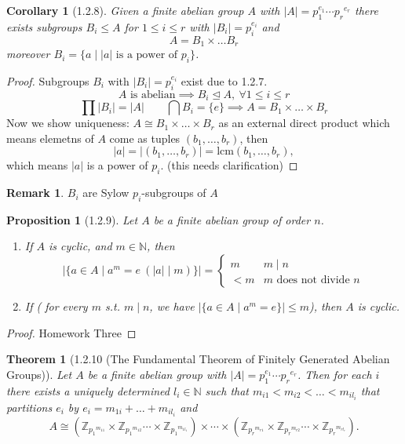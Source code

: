 \documentclass[11pt,leqno,oneside]{amsart}
\newcommand{\N}{{\mathbb N}} %
\newcommand{\Z}{{\mathbb Z}} %
\newcommand{\normsubgroup}{\mathrel{\unlhd}}
\newcommand{\isom}{\mathrel{\cong}}
\newcommand{\primedecomposition}[3]{#1_1^{#2_1} \cdots {#1_{#3}}^{#2_{#3}}}
\newtheorem*{thm*}{Theorem}
\newtheorem*{prop*}{Proposition}
\newtheorem*{cor*}{Corollary}
\theoremstyle{definition}
\newtheorem*{rmk*}{Remark}
\numberwithin{equation}{section}
\begin{document}
\begin{cor*}[1.2.8]
  Given a finite abelian group \(A\)
  with
  \(|A|=\primedecomposition{p}{e}{r}\)
  there exists subgroups \(B_i \le A\)
  for \(1 \le i \le r\) with
  \(|B_i|=p_i^{e_i}\) and
  \[A = B_1 \times \ldots B_r\] moreover
  \(B_i = \{a \mid |a| \text{ is a power
    of } p_i\}\).
\end{cor*}

\begin{proof}
  Subgroups \(B_i\) with
  \(|B_i|=p_i^{e_i}\) exist due to
  1.2.7.
  \[A \text{ is abelian} \implies B_i
    \normsubgroup A,\ \forall 1 \le i
    \le r\]
  \[\prod|B_i| = |A| \qquad \bigcap B_i
    = \{e\} \implies A = B_1 \times
    \ldots \times B_r\] Now we show
  uniqueness:
  \(A \isom B_1 \times \ldots \times
  B_r\) as an external direct product
  which means elemetns of \(A\) come as
  tuples \((b_1,\ldots,b_r)\), then
  \[|a|=|(b_1,\ldots,b_r)|=\text{lcm}(b_1,\ldots,b_r),\]
  which means \(|a|\) is a power of
  \(p_i\). (this needs clarification)
\end{proof}

\begin{rmk*}
  \(B_i\) are Sylow \(p_i\)-subgroups of
  \(A\)
\end{rmk*}

\begin{prop*}[1.2.9]
  Let \(A\) be a finite abelian group of
  order \(n\).
  \begin{enumerate}
  \item[(a)] If \(A\) is cyclic, and
    \(m \in \N\), then
    \[|\{a \in A \mid a^m = e\ (|a| \mid
      m)\}| =
      \begin{cases}
        m   &  m \mid n\\
        <m & m \text{ does not divide }
        n
      \end{cases}
    \]
  \item[(b)] If ( for every $m$ s.t. \(m \mid n\), we have
    \(|\{a \in A \mid a^m = e\}| \le
    m\)), then \(A\) is cyclic.
  \end{enumerate}
\end{prop*}
\begin{proof}
  Homework Three
\end{proof}

\begin{thm*}[1.2.10 (The Fundamental Theorem of Finitely Generated Abelian Groups)]
  Let \(A\) be a finite abelian group
  with
  \(|A|=\primedecomposition{p}{e}{r}\). Then
  for each \(i\) there exists a uniquely
  determined \(l_i \in \N\) such that
  \(m_{i1} < m_{i2} < \ldots <
  m_{il_i}\) that partitions \(e_i\) by
  \(e_i=m_{1i}+\ldots+m_{il_i}\) and
  \[A \isom (\Z_{{p_1}^{m_{11}}} \times
    \Z_{{p_1}^{m_{12}}} \cdots \times
    \Z_{{p_1}^{m_{1l_1}}}) \times \cdots
    \times (\Z_{{p_r}^{m_{r1}}} \times
    \Z_{{p_r}^{m_{r2}}} \cdots \times
    \Z_{{p_r}^{m_{rl_r}}}).\]
\end{thm*}
\end{document}
